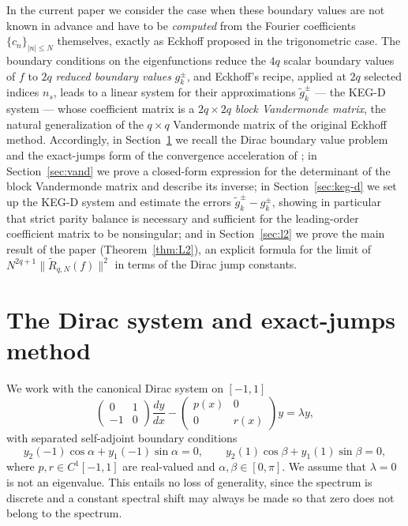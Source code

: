 \documentclass[11pt,a4paper]{article}
\theoremstyle{definition}
\begin{document}
In the current paper we consider the case when these boundary values
are not known in advance and have to be \emph{computed} from the
Fourier coefficients $\{c_n\}_{|n|\le N}$ themselves, exactly as
Eckhoff proposed in the trigonometric case. The boundary conditions on
the eigenfunctions reduce the $4q$ scalar boundary values of $f$ to
$2q$ \emph{reduced boundary values} $g_k^\pm$, and Eckhoff's recipe,
applied at $2q$ selected indices $n_s$, leads to a linear system for
their approximations $\widetilde g_k^\pm$ --- the KEG-D system ---
whose coefficient matrix is a $2q\times 2q$ \emph{block Vandermonde
matrix}, the natural generalization of the $q\times q$ Vandermonde
matrix of the original Eckhoff method. Accordingly, in Section~\ref{sec:dirac} we recall the
Dirac boundary value problem and the exact-jumps form of the
convergence acceleration of \cite{Bdirac}; in Section~\ref{sec:vand}
we prove a closed-form expression for the determinant of the block
Vandermonde matrix and describe its inverse; in Section~\ref{sec:keg-d}
we set up the KEG-D system and estimate the errors
$\widetilde g_k^\pm-g_k^\pm$, showing in particular that strict parity
balance is necessary and sufficient for the leading-order coefficient
matrix to be nonsingular; and in Section~\ref{sec:l2} we prove the
main result of the paper (Theorem~\ref{thm:L2}), an explicit formula
for the limit of
$N^{2q+1}\|\widetilde R_{q,N}(f)\|^2$ in terms of the Dirac jump
constants.


\section{The Dirac system and exact-jumps method}\label{sec:dirac}

We work with the canonical Dirac system on $[-1,1]$
\begin{equation}\label{eq:dirac}
\begin{pmatrix}0 & 1\\-1 & 0\end{pmatrix}\frac{dy}{dx}
-
\begin{pmatrix}p(x) & 0\\ 0 & r(x)\end{pmatrix}y
=
\lambda y,
\end{equation}
with separated self-adjoint boundary conditions
\begin{equation}\label{eq:bc}
y_2(-1)\cos\alpha+y_1(-1)\sin\alpha=0,
\qquad
y_2(1)\cos\beta+y_1(1)\sin\beta=0,
\end{equation}
where $p,r\in C^1[-1,1]$ are real-valued and
$\alpha,\beta\in[0,\pi]$. We assume that $\lambda=0$ is not an
eigenvalue. This entails no loss of generality, since the spectrum is
discrete and a constant spectral shift may always be made so that zero
does not belong to the spectrum.
\end{document}
